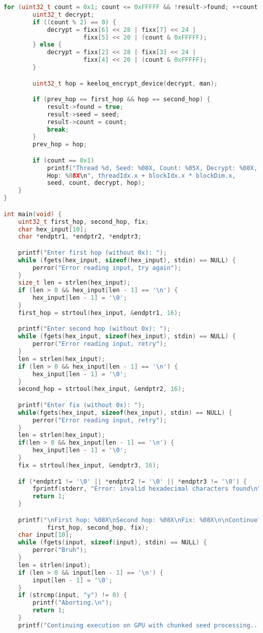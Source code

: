 \begin{lstlisting}[language=C++,basicstyle=\small,showstringspaces=false]
    for (uint32_t count = 0x1; count <= 0xFFFFF && !result->found; ++count) {
        uint32_t decrypt;
        if ((count % 2) == 0) {
            decrypt = fixx[6] << 28 | fixx[7] << 24 |
                      fixx[5] << 20 | (count & 0xFFFFF);
        } else {
            decrypt = fixx[2] << 28 | fixx[3] << 24 |
                      fixx[4] << 20 | (count & 0xFFFFF);
        }

        uint32_t hop = keeloq_encrypt_device(decrypt, man);

        if (prev_hop == first_hop && hop == second_hop) {
            result->found = true;
            result->seed = seed;
            result->count = count;
            break;
        }
        prev_hop = hop;

        if (count == 0x1)
            printf("Thread %d, Seed: %08X, Count: %05X, Decrypt: %08X,
            Hop: %08X\n", threadIdx.x + blockIdx.x * blockDim.x,
            seed, count, decrypt, hop);
    }
}

int main(void) {
    uint32_t first_hop, second_hop, fix;
    char hex_input[10];
    char *endptr1, *endptr2, *endptr3;

    printf("Enter first hop (without 0x): ");
    while (fgets(hex_input, sizeof(hex_input), stdin) == NULL) {
        perror("Error reading input, try again");
    }
    size_t len = strlen(hex_input);
    if (len > 0 && hex_input[len - 1] == '\n') {
        hex_input[len - 1] = '\0';
    }
    first_hop = strtoul(hex_input, &endptr1, 16);

    printf("Enter second hop (without 0x): ");
    while (fgets(hex_input, sizeof(hex_input), stdin) == NULL) {
        perror("Error reading input, retry");
    }
    len = strlen(hex_input);
    if (len > 0 && hex_input[len - 1] == '\n') {
        hex_input[len - 1] = '\0';
    }
    second_hop = strtoul(hex_input, &endptr2, 16);

    printf("Enter fix (without 0x): ");
    while(fgets(hex_input, sizeof(hex_input), stdin) == NULL) {
        perror("Error reading input, retry");
    }
    len = strlen(hex_input);
    if(len > 0 && hex_input[len - 1] == '\n') {
        hex_input[len - 1] = '\0';
    }
    fix = strtoul(hex_input, &endptr3, 16);

    if (*endptr1 != '\0' || *endptr2 != '\0' || *endptr3 != '\0') {
        fprintf(stderr, "Error: invalid hexadecimal characters found\n");
        return 1;
    }

    printf("\nFirst hop: %08X\nSecond hop: %08X\nFix: %08X\n\nContinue? (y/N) ",
            first_hop, second_hop, fix);
    char input[10];
    while (fgets(input, sizeof(input), stdin) == NULL) {
        perror("Bruh");
    }
    len = strlen(input);
    if (len > 0 && input[len - 1] == '\n') {
        input[len - 1] = '\0';
    }
    if (strcmp(input, "y") != 0) {
        printf("Aborting.\n");
        return 1;
    }
    printf("Continuing execution on GPU with chunked seed processing...\n");


\end{lstlisting}
